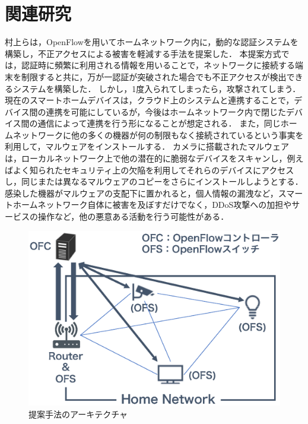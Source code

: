 \documentclass[a4paper,10pt,twocolumn,uplatex]{jsarticle}
\begin{document}
\section{関連研究}
村上らは，OpenFlowを用いてホームネットワーク内に，動的な認証システムを構築し，不正アクセスによる被害を軽減する手法を提案した\cite{related}．
本提案方式では，認証時に頻繁に利用される情報を用いることで，ネットワークに接続する端末を制限すると共に，万が一認証が突破された場合でも不正アクセスが検出できるシステムを構築した．
しかし，1度入られてしまったら，攻撃されてしまう．
現在のスマートホームデバイスは，クラウド上のシステムと連携することで，デバイス間の連携を可能にしているが，今後はホームネットワーク内で閉じたデバイス間の通信によって連携を行う形になることが想定される\cite{d2d}．
また，同じホームネットワークに他の多くの機器が何の制限もなく接続されているという事実を利用して，マルウェアをインストールする．
カメラに搭載されたマルウェアは，ローカルネットワーク上で他の潜在的に脆弱なデバイスをスキャンし，例えばよく知られたセキュリティ上の欠陥を利用してそれらのデバイスにアクセスし，同じまたは異なるマルウェアのコピーをさらにインストールしようとする．
感染した機器がマルウェアの支配下に置かれると，個人情報の漏洩など，スマートホームネットワーク自体に被害を及ぼすだけでなく，DDoS攻撃への加担やサービスの操作など，他の悪意ある活動を行う可能性がある\cite{disap}．

\begin{figure}[!tb]
  \centering
  \includegraphics[width=\linewidth]{img/architecture.eps}
  \caption{提案手法のアーキテクチャ}
  \label{fig:architecture}
\end{figure}
\end{document}
